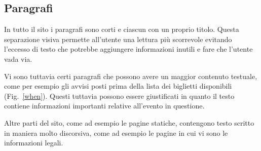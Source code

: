\subsection{Paragrafi}
	In tutto il sito i paragrafi sono corti e ciascun con un proprio titolo.
	Questa separazione visiva permette all'utente una lettura più scorrevole evitando l'eccesso di testo che potrebbe aggiungere informazioni inutili e fare che l'utente vada via.
	\par Vi sono tuttavia certi paragrafi che possono avere un maggior contenuto testuale, come per esempio gli avvisi posti prima della lista dei biglietti disponibili (Fig.~\ref{when}).
	Questi tuttavia possono essere giustificati in quanto il testo contiene informazioni importanti relative all'evento in questione.
	\par Altre parti del sito, come ad esempio le pagine statiche, contengono testo scritto in maniera molto discorsiva, come ad esempio le pagine in cui vi sono le informazioni legali.
